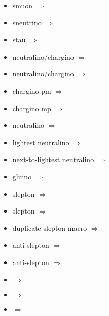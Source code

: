 \begin{multicols}{2}
{\begin{itemize}
\item smuon\newline {} $\Rightarrow$ \PSmu
\item sneutrino\newline {} $\Rightarrow$ \PSnu
\item stau\newline {} $\Rightarrow$ \PStau
\item neutralino/chargino\newline {} $\Rightarrow$ \PSino
\item neutralino/chargino\newline {} $\Rightarrow$ \PSgaugino
\item chargino pm\newline {} $\Rightarrow$ \PScharginopm
\item chargino mp\newline {} $\Rightarrow$ \PScharginomp
\item neutralino\newline {} $\Rightarrow$ \PSneutralino
\item lightest neutralino\newline {} $\Rightarrow$ \PSneutralinoOne
\item next-to-lightest neutralino\newline {} $\Rightarrow$ \PSneutralinoTwo
\item gluino\newline {} $\Rightarrow$ \PSgluino
\item slepton\newline {} $\Rightarrow$ \PSlepton
\item slepton\newline {} $\Rightarrow$ \PSslepton
\item duplicate slepton macro\newline {} $\Rightarrow$ \Pslepton
\item anti-slepton\newline {} $\Rightarrow$ \APSlepton
\item anti-slepton\newline {} $\Rightarrow$ \APslepton
\item  {} $\Rightarrow$ \PSq
\item  {} $\Rightarrow$ \Psquark
\item  {} $\Rightarrow$ \APSq

\end{itemize}}
\end{multicols}

